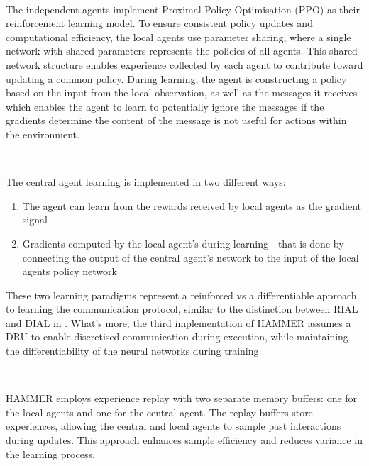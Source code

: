 \documentclass{article}
\begin{document}
\

The independent agents implement Proximal Policy Optimisation (PPO) \citep{schulman2017proximal} as their reinforcement learning model. To ensure consistent policy updates and computational efficiency, the local agents use parameter sharing, where a single network with shared parameters represents the policies of all agents. This shared network structure enables experience collected by each agent to contribute toward updating a common policy. During learning, the agent is constructing a policy based on the input from the local observation, as well as the messages it receives which enables the agent to learn to potentially ignore the messages if the gradients determine the content of the message is not useful for actions within the environment. 

\

The central agent learning is implemented in two different ways:
\begin{enumerate}
    \item The agent can learn from the rewards received by local agents as the gradient signal
    \item Gradients computed by the local agent's during learning - that is done by connecting the output of the central agent's network to the input of the local agents policy network
\end{enumerate}

These two learning paradigms represent a reinforced vs a differentiable approach to learning the communication protocol, similar to the distinction between RIAL and DIAL in \citet{foerster2016learning}. What's more, the third implementation of HAMMER assumes a DRU to enable discretised communication during execution, while maintaining the differentiability of the neural networks during training.

\

HAMMER employs experience replay with two separate memory buffers: one for the local agents and one for the central agent. The replay buffers store experiences, allowing the central and local agents to sample past interactions during updates. This approach enhances sample efficiency and reduces variance in the learning process.
\end{document}
